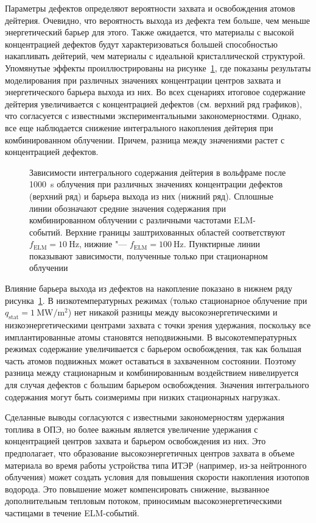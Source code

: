 Параметры дефектов определяют вероятности захвата и освобождения атомов дейтерия. Очевидно, что вероятность выхода из дефекта тем больше, чем меньше энергетический барьер для этого. Также ожидается, что материалы с высокой концентрацией дефектов будут характеризоваться большей способностью накапливать дейтерий, чем материалы с идеальной кристаллической структурой. Упомянутые эффекты проиллюстрированы на рисунке~\cref{fig:ch3/eta_Edt_var}, где показаны результаты моделирования при различных значениях концентрации центров захвата и энергетического барьера выхода из них. Во всех сценариях итоговое содержание дейтерия увеличивается с концентрацией дефектов (см. верхний ряд графиков), что согласуется с известными экспериментальными закономерностями. Однако, все еще наблюдается снижение интегрального накопления дейтерия при комбинированном облучении. Причем, разница между значениями растет с концентрацией дефектов.
\begin{figure}[ht]
	\caption{Зависимости интегрального содержания дейтерия в вольфраме после \SI{1000}{\second} облучения при различных значениях концентрации дефектов (верхний ряд) и барьера выхода из них (нижний ряд). Сплошные линии обозначают средние значения содержания при комбинированном облучении с различными частотами ELM-событий. Верхние границы заштрихованных областей соответствуют \(f_\mathrm{ELM} = \SI{10}{\hertz}\), нижние "--- \(f_\mathrm{ELM} = \SI{100}{\hertz}\). Пунктирные линии показывают зависимости, полученные только при стационарном облучении}\label{fig:ch3/eta_Edt_var}
\end{figure}

Влияние барьера выхода из дефектов на накопление показано в нижнем ряду рисунка~\cref{fig:ch3/eta_Edt_var}. В низкотемпературных режимах (только стационарное облучение при $q_{\mathrm{stat}}=\SI{1}{\mega\watt\per\meter\squared}$) нет никакой разницы между высокоэнергетическими и низкоэнергетическими центрами захвата с точки зрения удержания, поскольку все имплантированные атомы становятся неподвижными. В высокотемпературных режимах содержание увеличивается с барьером освобождения, так как большая часть атомов подвижных может оставаться в захваченном состоянии. Поэтому разница между стационарным и комбинированным воздействием нивелируется для случая дефектов с большим барьером освобождения. Значения интегрального содержания могут быть соизмеримы при низких стационарных нагрузках.

Сделанные выводы согласуются с известными закономерностям удержания топлива в ОПЭ, но более важным является увеличение удержания с концентрацией центров захвата и барьером освобождения из них. Это предполагает, что образование высокоэнергетичных центров захвата в объеме материала во время работы устройства типа ИТЭР (например, из-за нейтронного облучения) может создать условия для повышения скорости накопления изотопов водорода. Это повышение может компенсировать снижение, вызванное дополнительным тепловым потоком, приносимым высокоэнергетическими частицами в течение ELM-событий.

